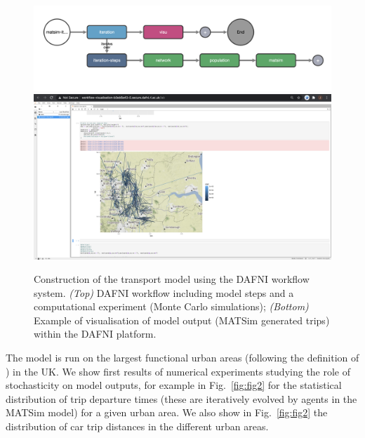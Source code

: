 \documentclass[3p,times,procedia]{elsarticle}
\begin{document}
\begin{figure}[t]\vspace*{4pt}
\begin{center}
\includegraphics[width=0.7\linewidth]{figures/matsim-iterations_workflow.png}\\
\includegraphics[width=0.7\linewidth]{figures/visu-trips-Leeds.png}	
\end{center}
\caption{Construction of the transport model using the DAFNI workflow system. \textit{(Top)} DAFNI workflow including model steps and a computational experiment (Monte Carlo simulations); \textit{(Bottom)} Example of visualisation of model output (MATSim generated trips) within the DAFNI platform.\label{fig:fig1}}
\end{figure}




The model is run on the largest functional urban areas (following the definition of \cite{florczyk2019ghsl}) in the UK. We show first results of numerical experiments studying the role of stochasticity on model outputs, for example in Fig.~\ref{fig:fig2} for the statistical distribution of trip departure times (these are iteratively evolved by agents in the MATSim model) for a given urban area. We also show in Fig.~\ref{fig:fig2} the distribution of car trip distances in the different urban areas.
\end{document}
